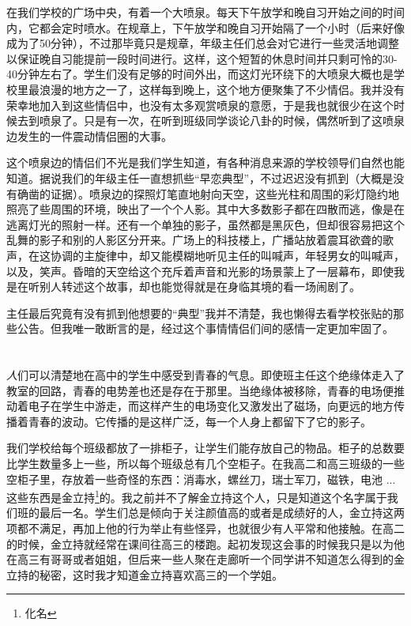 \documentclass[UTF8,oneside]{ctexbook}
\begin{document}
在我们学校的广场中央，有着一个大喷泉。每天下午放学和晚自习开始之间的时间内，它都会定时喷水。在规章上，下午放学和晚自习开始隔了一个小时（后来好像成为了50分钟），不过那毕竟只是规章，年级主任们总会对它进行一些灵活地调整以保证晚自习能提前一段时间进行。这样，这个短暂的休息时间并只剩可怜的30-40分钟左右了。学生们没有足够的时间外出，而这灯光环绕下的大喷泉大概也是学校里最浪漫的地方之一了，这样每到晚上，这个地方便聚集了不少情侣。我并没有荣幸地加入到这些情侣中，也没有太多观赏喷泉的意愿，于是我也就很少在这个时候去到喷泉了。只是有一次，在听到班级同学谈论八卦的时候，偶然听到了这喷泉边发生的一件震动情侣圈的大事。

这个喷泉边的情侣们不光是我们学生知道，有各种消息来源的学校领导们自然也能知道。据说我们的年级主任一直想抓些``早恋典型''，不过迟迟没有抓到（大概是没有确凿的证据）。喷泉边的探照灯笔直地射向天空，这些光柱和周围的彩灯隐约地照亮了些周围的环境，映出了一个个人影。其中大多数影子都在四散而逃，像是在逃离灯光的照射一样。还有一个单独的影子，虽然都是黑灰色，但却很容易把这个乱舞的影子和别的人影区分开来。广场上的科技楼上，广播站放着震耳欲聋的歌声，在这协调的主旋律中，却又能模糊地听见主任的叫喊声，年轻男女的叫喊声，以及，笑声。昏暗的天空给这个充斥着声音和光影的场景蒙上了一层幕布，即使我是在听别人转述这个故事，却也能觉得就是在身临其境的看一场闹剧了。

主任最后究竟有没有抓到他想要的``典型''我并不清楚，我也懒得去看学校张贴的那些公告。但我唯一敢断言的是，经过这个事情情侣们间的感情一定更加牢固了。

\chapter{}
{\Large \emph{人}}们可以清楚地在高中的学生中感受到青春的气息。即使班主任这个绝缘体走入了教室的回路，青春的电势差也还是存在于那里。当绝缘体被移除，青春的电场便推动着电子在学生中游走，而这样产生的电场变化又激发出了磁场，向更远的地方传播着青春的波动。它传播的是这样广泛，每一个人身上都留下了它的影子。

我们学校给每个班级都放了一排柜子，让学生们能存放自己的物品。柜子的总数要比学生数量多上一些，所以每个班级总有几个空柜子。在我高二和高三班级的一些空柜子里，存放着一些奇怪的东西：消毒水，螺丝刀，瑞士军刀，磁铁，电池 ... 这些东西是金立持\footnote{化名}的。我之前并不了解金立持这个人，只是知道这个名字属于我们班的最后一名。学生们总是倾向于关注颜值高的或者是成绩好的人，金立持这两项都不满足，再加上他的行为举止有些怪异，也就很少有人平常和他接触。在高二的时候，金立持就经常在课间往高三的楼跑。起初发现这会事的时候我只是以为他在高三有哥哥或者姐姐，但后来一些人聚在走廊听一个同学讲不知道怎么得到的金立持的秘密，这时我才知道金立持喜欢高三的一个学姐。
\end{document}
